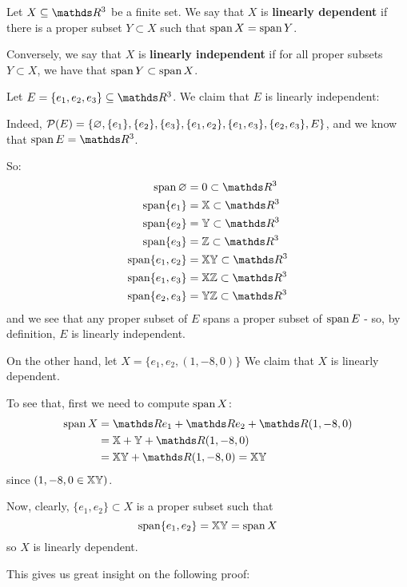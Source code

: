 \begin{df}
	Let $X\subseteq\R^3$ be a finite set. We say that $X$ is \textbf{linearly dependent} if there is a proper subset $Y\subset X$ such that $\operatorname{span} X=\operatorname{span} Y$.
	
	Conversely, we say that $X$ is \textbf{linearly independent} if for all proper subsets $Y\subset X$, we have that $\operatorname{span} Y\subset \operatorname{span} X$.
\end{df}

\begin{ex}
	Let $E=\{e_1,e_2,e_3\}\subseteq \R^3$. We claim that $E$ is linearly independent:
	
	Indeed, $\mathcal P(E)=\{\varnothing,\{e_1\},\{e_2\},\{e_3\},\{e_1,e_2\},\{e_1,e_3\},\{e_2,e_3\},E\}$, and we know that $\spen E=\R^3$.
	
	So:
	\begin{align*}
		\spen \varnothing &= 0\subset \R^3\\
		\spen \{e_1\}&=\mb X\subset\R^3\\
		\spen \{e_2\}&=\mb Y\subset\R^3\\
		\spen \{e_3\}&=\mb Z\subset\R^3\\
		\spen \{e_1,e_2\}&=\mb {XY}\subset\R^3\\
		\spen \{e_1,e_3\}&=\mb{ XZ}\subset\R^3\\
		\spen \{e_2,e_3\}&=\mb {YZ}\subset\R^3
	\end{align*}and we see that any proper subset of $E$ spans a proper subset of $\operatorname{span} E$ - so, by definition, $E$ is linearly independent.
	
	\bigskip
	On the other hand, let $X=\{e_1,e_2,(1,-8,0)\}$ We claim that $X$ is linearly dependent.
	
	To see that, first we need to compute $\operatorname{span} X$:
	\begin{align*}
		\spen X&=\R e_1+\R e_2+\R(1,-8,0)\\
		&=\mb{X+Y}+\R(1,-8,0)\\
		&=\mb{XY}+\R(1,-8,0)=\mb{XY}
	\end{align*} since $(1,-8,0\in \mathbb{XY})$.
	
	Now, clearly, $\{e_1,e_2\}\subset X$ is a proper subset such that 
	\[\operatorname{span}\{e_1,e_2\}=\mathbb{XY}=\operatorname{span} X\]so $X$ is linearly dependent.
\end{ex}

This gives  us great insight on the following proof:

